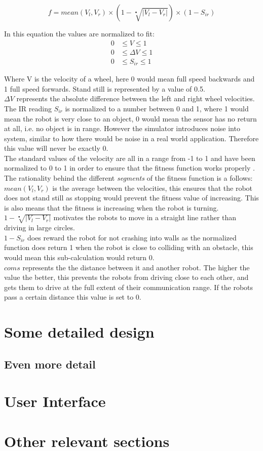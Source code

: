 \begin{equation}\label{eq:base_fittness}
f = mean(V_l, V_r) \times ( 1 - \sqrt[•]{|V_l - V_r|}) \times (1 - S_{ir})
\end{equation}

In this equation the values are normalized to fit:
\begin{align*}
	0  &\leq V \leq 1 \\  
	0  &\leq \Delta V  \leq 1 \\
	0  &\leq S_{ir} \leq 1
\end{align*}

Where V is the velocity of a wheel, here 0 would mean full speed backwards and 1 full speed forwards. Stand still is represented by a value of 0.5.\\
$\Delta V$ represents the absolute difference between the left and right wheel velocities. \\
The IR reading $S_{ir}$ is normalized to a number between 0 and 1, where 1 would mean the robot is very close to an object, 0 would mean the sensor has no return at all, i.e. no object is in range. However the simulator introduces noise into system, similar to how there would be noise in a real world application. Therefore this value will never be exactly 0. \\
The standard values of the velocity are all in a range from -1 to 1 and have been normalized to 0 to 1 in order to ensure that the fitness function works properly \cite{499791}.  \\
The rationality behind the different \textit{segments} of the fitness function is a follows: 
$mean(V_l, V_r)$ is the average between the velocities, this ensures that the robot does not stand still as stopping would prevent the fitness value of increasing. This is also means that the fitness is increasing when the robot is turning. \\
$1 - \sqrt[•]{|V_l - V_r|}$ motivates the robots to move in a straight line rather than driving in large circles. \\
$1 - S_{ir}$ does reward the robot for not crashing into walls as the normalized function does return 1 when the robot is close to colliding with an obstacle, this would mean this sub-calculation would return 0. \\
$coms$ represents the the distance between it and another robot. The higher the value the better, this prevents the robots from driving close to each other, and gets them to drive at the full extent of their communication range. If the robots pass a certain distance this value is set to 0. 
\section{Some detailed design}

\subsection{Even more detail}

\section{User Interface}

\section{Other relevant sections}